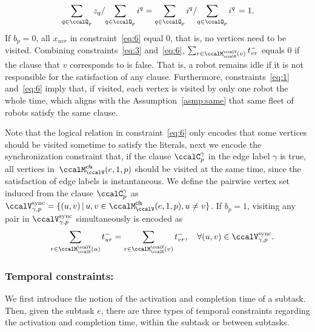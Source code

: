 \documentclass[Afour,sageh,times]{sagej}
\newtheorem{defn}[thm]{Definition}
\begin{document}
{{{{{  \begin{align*}
   \left. \sum_{q\in \ccalQ_p} z_q \small/ {\sum_{q\in \ccalQ_p} i^q} = {\sum_{q\in \ccalQ_p} i^q} \small/{\sum_{q\in \ccalQ_p} i^q} \right. = 1.
  \end{align*}
If $b_p=0$, all $x_{uvr}$ in constraint~\eqref{eq:6} equal 0, that is, no vertices need to be visited. Combining constraints~\eqref{eq:3} and~\eqref{eq:6}, $\sum_{r\in \ccalM^\ccalV_{\ccalK}(v)} t^-_{vr}$ equals 0 if the  clause that $v$ corresponds to is false. That is, a robot remains idle if it is not responsible for the satisfaction of any clause. Furthermore, constraints~\eqref{eq:1} and~\eqref{eq:6} imply that, if visited, each vertex is visited by only one robot the whole time, which aligns with the Assumption~\ref{asmp:same} that same fleet of robots satisfy the same clause.

    Note that the logical relation in constraint~\eqref{eq:6} only encodes that some vertices should be visited sometime to satisfy the literals, next we encode the synchronization constraint that, if the clause $\ccalC_p^\gamma$ in the edge label $\gamma$ is true, all vertices in~$\ccalM^\mathsf{cls}_\ccalV(e, 1,p)$ should be visited at the same time, since the satisfaction of edge labels is instantaneous.
      We define the pairwise vertex set induced from the clause $\ccalC_p^\gamma$ as  $\ccalV_{\gamma, p}^{\text{sync}} = \{(u,v)\,|\, u, v\in \ccalM^\mathsf{cls}_\ccalV(e,1,p), u\not= v \}$. If $b_p=1$, visiting any pair in $\ccalV_{\gamma, p}^{\text{sync}}$ simultaneously is encoded as
\begingroup\makeatletter\def\f@size{10}\check@mathfonts
\def\maketag@@@#1{\hbox{\m@th\normalsize\normalfont#1}}%
\begin{align}
  & \quad\quad  \sum_{r\in \ccalM^\ccalV_{\ccalK}(u)} t_{ur}^-  = \sum_{r\in \ccalM^\ccalV_{\ccalK}(v)} t_{vr}^- , \quad\forall (u,v) \in \ccalV_{\gamma, p}^{\text{sync}}.\label{eq:7}
\end{align}
\endgroup





\subsubsection{Temporal constraints:}\label{sec:temporal} We first introduce the notion of the activation and completion time of a subtask. Then, given the subtask $e$, there are three types of temporal constraints regarding the activation and completion time,  within the subtask or between subtasks.
}}}}}
\end{document}
